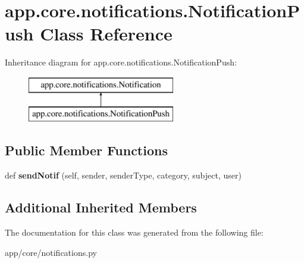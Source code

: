 \hypertarget{classapp_1_1core_1_1notifications_1_1_notification_push}{}\section{app.\+core.\+notifications.\+Notification\+Push Class Reference}
\label{classapp_1_1core_1_1notifications_1_1_notification_push}
Inheritance diagram for app.\+core.\+notifications.\+Notification\+Push\+:\begin{figure}[H]
\begin{center}
\leavevmode
\includegraphics[height=2.000000cm]{classapp_1_1core_1_1notifications_1_1_notification_push}
\end{center}
\end{figure}
\subsection*{Public Member Functions}
\begin{DoxyCompactItemize}
\item 
\mbox{\label{classapp_1_1core_1_1notifications_1_1_notification_push_a68c84cba3fed845015864ba7b14fd2f3}} 
def {\bfseries send\+Notif} (self, sender, sender\+Type, category, subject, user)
\end{DoxyCompactItemize}
\subsection*{Additional Inherited Members}


The documentation for this class was generated from the following file\+:\begin{DoxyCompactItemize}
\item 
app/core/notifications.\+py\end{DoxyCompactItemize}
